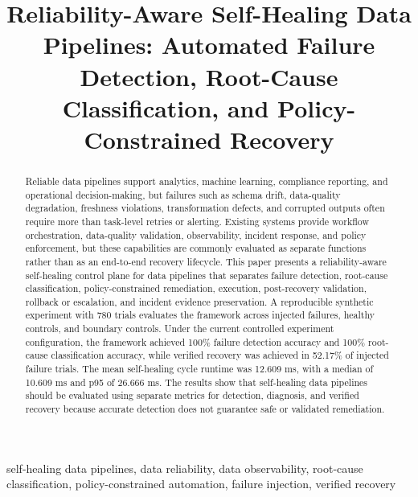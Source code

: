 \documentclass[conference]{IEEEtran}
\begin{document}
\title{Reliability-Aware Self-Healing Data Pipelines: Automated Failure Detection, Root-Cause Classification, and Policy-Constrained Recovery}

\author{
}

\maketitle

\begin{abstract}
Reliable data pipelines support analytics, machine learning, compliance reporting, and operational decision-making, but failures such as schema drift, data-quality degradation, freshness violations, transformation defects, and corrupted outputs often require more than task-level retries or alerting. Existing systems provide workflow orchestration, data-quality validation, observability, incident response, and policy enforcement, but these capabilities are commonly evaluated as separate functions rather than as an end-to-end recovery lifecycle. This paper presents a reliability-aware self-healing control plane for data pipelines that separates failure detection, root-cause classification, policy-constrained remediation, execution, post-recovery validation, rollback or escalation, and incident evidence preservation. A reproducible synthetic experiment with 780 trials evaluates the framework across injected failures, healthy controls, and boundary controls. Under the current controlled experiment configuration, the framework achieved 100\% failure detection accuracy and 100\% root-cause classification accuracy, while verified recovery was achieved in 52.17\% of injected failure trials. The mean self-healing cycle runtime was 12.609 ms, with a median of 10.609 ms and p95 of 26.666 ms. The results show that self-healing data pipelines should be evaluated using separate metrics for detection, diagnosis, and verified recovery because accurate detection does not guarantee safe or validated remediation.
\end{abstract}

\begin{IEEEkeywords}
self-healing data pipelines, data reliability, data observability, root-cause classification, policy-constrained automation, failure injection, verified recovery
\end{IEEEkeywords}













\end{document}
